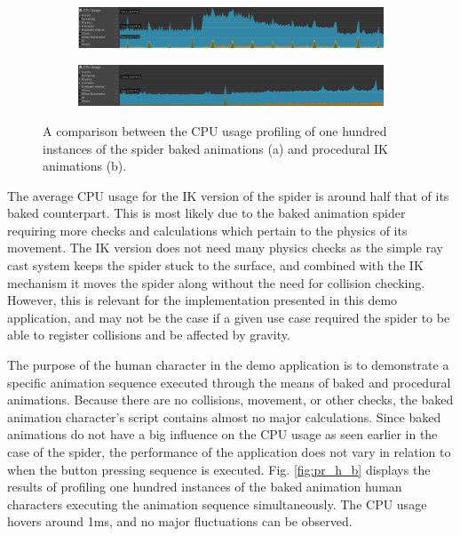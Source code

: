 \begin{figure}
    \centering
    \captionsetup{justification=centering}
    \begin{subfigure}{\textwidth}
        \centering
        \includegraphics[width=\linewidth]{grafika/pr_sp_b.eps}
        \subcaption{}
        \label{fig:pr_sp_b}
    \end{subfigure}
    \begin{subfigure}{\textwidth}
        \centering
        \includegraphics[width=\linewidth]{grafika/pr_sp_ik.eps}
        \subcaption{}
        \label{fig:pr_sp_ik}
    \end{subfigure}
    \caption{A comparison between the CPU usage profiling of one hundred
    instances of the spider baked animations (a) and procedural IK
    animations (b).}
    \label{fig:pr_sp}
\end{figure}

The average CPU usage for the IK version of the spider is around half that of its
baked counterpart. This is most likely due to the baked animation spider
requiring more checks and calculations which pertain to the physics of its
movement. The IK version does not need many physics checks as the simple ray
cast system keeps the spider stuck to the surface, and combined with the IK
mechanism it moves the spider along without the need for collision checking.
However, this is relevant for the implementation presented in this demo
application, and may not be the case if a given use case required the spider to
be able to register collisions and be affected by gravity.

The purpose of the human character in the demo application is to demonstrate
a specific animation sequence executed through the means of baked and procedural
animations. Because there are no collisions, movement, or other checks, the baked
animation character's script contains almost no major calculations. Since
baked animations do not have a big influence on the CPU usage as seen earlier in
the case of the spider, the performance of the application does not vary in
relation to when the button pressing sequence is executed. Fig.
\ref{fig:pr_h_b} displays the results of profiling one hundred instances of the
baked animation human characters executing the animation sequence
simultaneously. The CPU usage hovers around 1ms, and no major fluctuations can be
observed.

